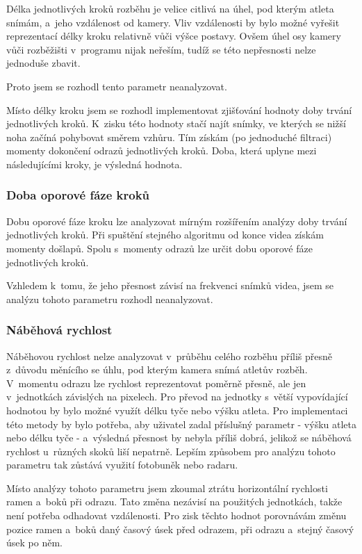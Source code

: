 Délka jednotlivých kroků rozběhu je velice citlivá na úhel, pod kterým atleta snímám, a~jeho vzdálenost od kamery. Vliv vzdálenosti by bylo možné vyřešit reprezentací délky kroku relativně vůči výšce postavy. Ovšem úhel osy kamery vůči rozběžišti v~programu nijak neřeším, tudíž se této nepřesnosti nelze jednoduše zbavit.

Proto jsem se rozhodl tento parametr neanalyzovat.

Místo délky kroku jsem se rozhodl implementovat zjišťování hodnoty doby trvání jednotlivých kroků. K~zisku této hodnoty stačí najít snímky, ve kterých se nižší noha začíná pohybovat směrem vzhůru. Tím získám (po jednoduché filtraci) momenty dokončení odrazů jednotlivých kroků. Doba, která uplyne mezi následujícími kroky, je výsledná hodnota.


\subsubsection{Doba oporové fáze kroků}

Dobu oporové fáze kroku lze analyzovat mírným rozšířením analýzy doby trvání jednotlivých kroků. Při spuštění stejného algoritmu od konce videa získám momenty došlapů. Spolu s~momenty odrazů lze určit dobu oporové fáze jednotlivých kroků.

Vzhledem k~tomu, že jeho přesnost závisí na frekvenci snímků videa, jsem se analýzu tohoto parametru rozhodl neanalyzovat.


\subsubsection{Náběhová rychlost}

Náběhovou rychlost nelze analyzovat v~průběhu celého rozběhu příliš přesně z~důvodu měnícího se úhlu, pod kterým kamera snímá atletův rozběh. V~momentu odrazu lze rychlost reprezentovat poměrně přesně, ale jen v~jednotkách závislých na pixelech. Pro převod na jednotky s~větší vypovídající hodnotou by bylo možné využít délku tyče nebo výšku atleta. Pro implementaci této metody by bylo potřeba, aby uživatel zadal příslušný parametr - výšku atleta nebo délku tyče - a~výsledná přesnost by nebyla příliš dobrá, jelikož se náběhová rychlost u~různých skoků liší nepatrně. Lepším způsobem pro analýzu tohoto parametru tak zůstává využití fotobuněk nebo radaru.

Místo analýzy tohoto parametru jsem zkoumal ztrátu horizontální rychlosti ramen a~boků při odrazu. Tato změna nezávisí na použitých jednotkách, takže není potřeba odhadovat vzdálenosti. Pro zisk těchto hodnot porovnávám změnu pozice ramen a~boků daný časový úsek před odrazem, při odrazu a~stejný časový úsek po něm.


